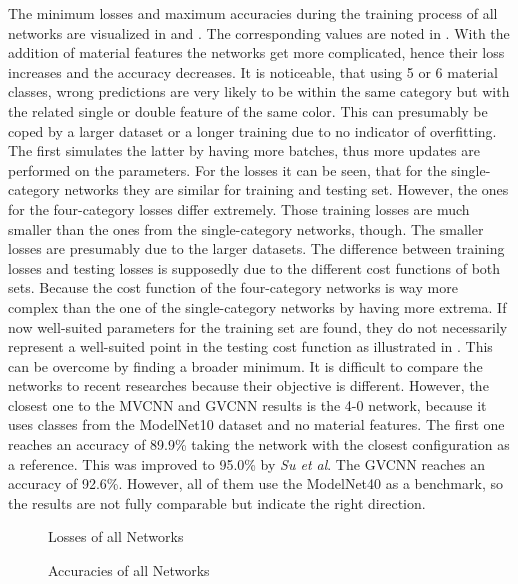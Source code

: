 The minimum losses and maximum accuracies during the training process of all networks are visualized in  and .
The corresponding values are noted in .
With the addition of material features the networks get more complicated, hence their loss increases and the accuracy decreases.
It is noticeable, that using 5 or 6 material classes, wrong predictions are very likely to be within the same category but with the related single or double feature of the same color.
This can presumably be coped by a larger dataset or a longer training due to no indicator of overfitting.
The first simulates the latter by having more batches, thus more updates are performed on the parameters.
For the losses it can be seen, that for the single-category networks they are similar for training and testing set.
However, the ones for the four-category losses differ extremely.
Those training losses are much smaller than the ones from the single-category networks, though.
The smaller losses are presumably due to the larger datasets.
The difference between training losses and testing losses is supposedly due to the different cost functions of both sets.
Because the cost function of the four-category networks is way more complex than the one of the single-category networks by having more extrema.
If now well-suited parameters for the training set are found, they do not necessarily represent a well-suited point in the testing cost function as illustrated in .
This can be overcome by finding a broader minimum.
It is difficult to compare the networks to recent researches because their objective is different.
However, the closest one to the MVCNN and GVCNN results is the 4-0 network, because it uses classes from the ModelNet10 dataset and no material features.
The first one reaches an accuracy of 89.9\% taking the network with the closest configuration as a reference.
This was improved to 95.0\% by \textit{Su et al}.
The GVCNN reaches an accuracy of 92.6\%.
However, all of them use the ModelNet40 as a benchmark, so the results are not fully comparable but indicate the right direction.
\begin{figure}
	\setlength{}
	\setlength{}
	\centering
	
	\caption{Losses of all Networks}
	\label{fig:losses}
\end{figure}
\begin{figure}
	\setlength{}
	\setlength{}
	\centering
	
	\caption{Accuracies of all Networks}
	\label{fig:accuracies}
\end{figure}

